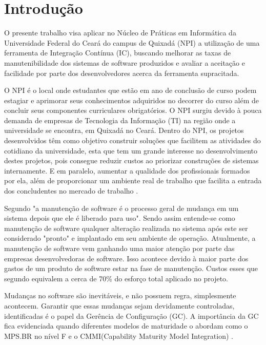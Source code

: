 \chapter*[Introdução]{Introdução}

O presente trabalho visa aplicar no Núcleo de Práticas em Informática da Universidade Federal do Ceará do campus de Quixadá (NPI) a utilização de uma ferramenta de Integração Contínua (IC), buscando melhorar as taxas de manutenibilidade dos sistemas de software produzidos e avaliar a aceitação e facilidade por parte dos desenvolvedores acerca da ferramenta supracitada.

O NPI é o local onde estudantes que estão em ano de conclusão de curso podem estagiar e aprimorar seus conhecimentos adquiridos no decorrer do curso além de concluir seus componentes curriculares obrigatórios. O NPI surgiu devido à pouca demanda de empresas de Tecnologia da Informação (TI) na região onde a universidade se encontra, em Quixadá no Ceará. Dentro do NPI, os projetos desenvolvidos têm como objetivo construir soluções que facilitem as atividades do cotidiano da universidade, esta que tem um grande interesse no desenvolvimento destes projetos, pois consegue reduzir custos ao priorizar construções de sistemas internamente. E em paralelo, aumentar a qualidade dos profissionais formados por ela, além de proporcionar um ambiente real de trabalho que facilita a entrada dos concludentes no mercado de trabalho \cite{npi2013}.

Segundo  "a manutenção de software é o processo geral de mudança em um sistema depois que ele é liberado para uso". Sendo assim entende-se como manutenção de software  qualquer alteração realizada no sistema após este ser considerado "pronto" e implantado em seu ambiente de operação. Atualmente, a manutenção de software vem ganhando uma maior atenção por parte das empresas desenvolvedoras de software. Isso acontece devido à maior parte dos gastos de um produto de software estar na fase de manutenção. Custos esses que segundo  equivalem a  cerca de 70\% do esforço total aplicado no projeto.

Mudanças no software são inevitáveis, e não possuem regra, simplesmente acontecem. Garantir que essas mudanças sejam devidamente controladas, identificadas é o papel da  Gerência de Configuração (GC). A importância da GC fica evidenciada quando diferentes modelos de maturidade o abordam como o MPS.BR no nível F e o CMMI(Capability Maturity Model Integration) \cite{furlaneto2006}.

